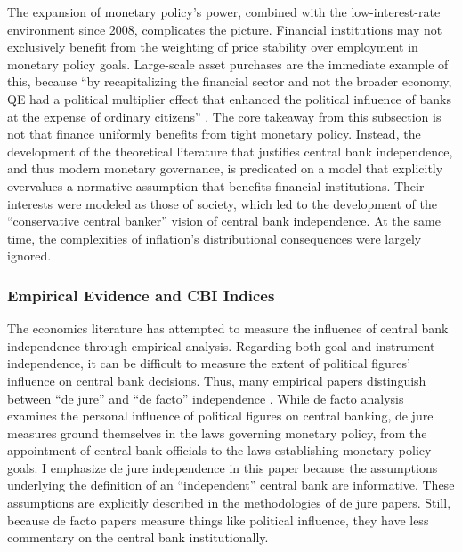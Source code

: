 \documentclass[12pt,a4paper]{article}
\begin{document}
\begin{doublespace}
The expansion of monetary policy's power, combined with the low-interest-rate environment since 2008, complicates the picture. Financial institutions may not exclusively benefit from the weighting of price stability over employment in monetary policy goals. Large-scale asset purchases are the immediate example of this, because ``by recapitalizing the financial sector and not the broader economy, QE had a political multiplier effect that enhanced the political influence of banks at the expense of ordinary citizens'' \parencite[738]{adolph_missing_2018}. The core takeaway from this subsection is not that finance uniformly benefits from tight monetary policy. Instead, the development of the theoretical literature that justifies central bank independence, and thus modern monetary governance, is predicated on a model that explicitly overvalues a normative assumption that benefits financial institutions. Their interests were modeled as those of society, which led to the development of the ``conservative central banker'' vision of central bank independence. At the same time, the complexities of inflation's distributional consequences were largely ignored. 



\subsubsection{Empirical Evidence and CBI Indices}
\label{sec:analysis_empiricial_cbi_indices}



The economics literature has attempted to measure the influence of central bank independence through empirical analysis. Regarding both goal and instrument independence, it can be difficult to measure the extent of political figures' influence on central bank decisions. Thus, many empirical papers distinguish between ``de jure'' and ``de facto'' independence \parencite{romelli_political_2022}. While de facto analysis examines the personal influence of political figures on central banking, de jure measures ground themselves in the laws governing monetary policy, from the appointment of central bank officials to the laws establishing monetary policy goals. I emphasize de jure independence in this paper because the assumptions underlying the definition of an ``independent'' central bank are informative. These assumptions are explicitly described in the methodologies of de jure papers. Still, because de facto papers measure things like political influence, they have less commentary on the central bank institutionally.


\end{doublespace}
\end{document}
